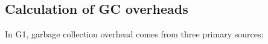 %
%


%
%
\subsection{Calculation of GC overheads}
In G1, garbage collection overhead comes from three primary sources:

